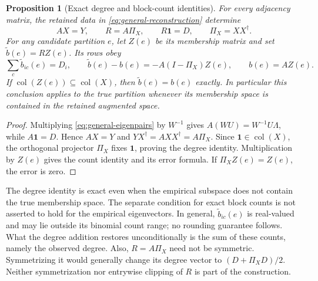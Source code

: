 \documentclass[11pt]{article}
\newtheorem{proposition}[theorem]{Proposition}
\theoremstyle{definition}
\theoremstyle{remark}
\newcommand{\one}{\mathbf 1}
\numberwithin{equation}{section}
\begin{document}
\begin{proposition}[Exact degree and block-count identities]
\label{prop:degree-count-identities}
For every adjacency matrix, the retained data in
\eqref{eq:general-reconstruction} determine
\begin{equation}
 AX=Y,\qquad R=A\Pi_X,\qquad R\one=D,
 \qquad \Pi_X=XX^\dagger.
 \label{eq:degree-identities}
\end{equation}
For any candidate partition $e$, let $Z(e)$ be its membership matrix and set
$\widetilde b(e)=RZ(e)$. Its rows obey
\begin{equation}
 \sum_c\widetilde b_{ic}(e)=D_i,\qquad
 \widetilde b(e)-b(e)=-A(I-\Pi_X)Z(e),\qquad b(e)=AZ(e).
 \label{eq:general-block-counts}
\end{equation}
If $\operatorname{col}(Z(e))\subseteq\operatorname{col}(X)$, then
$\widetilde b(e)=b(e)$ exactly. In particular this conclusion applies to
the true partition whenever its membership space is contained in the
retained augmented space.
\end{proposition}
\begin{proof}
Multiplying \eqref{eq:general-eigenpairs} by $W^{-1}$ gives
$A(WU)=W^{-1}U\Lambda$, while $A\one=D$. Hence $AX=Y$ and
$YX^\dagger=AXX^\dagger=A\Pi_X$. Since $\one\in\operatorname{col}(X)$,
the orthogonal projector $\Pi_X$ fixes $\one$, proving the degree identity.
Multiplication by $Z(e)$ gives the count identity and its error formula.
If $\Pi_XZ(e)=Z(e)$, the error is zero.
\end{proof}

The degree identity is exact even when the empirical subspace does not
contain the true membership space. The separate condition for exact block
counts is not asserted to hold for the empirical eigenvectors. In general,
$\widetilde b_{ic}(e)$ is real-valued and may lie outside its binomial count
range; no rounding guarantee follows. What the degree addition restores
unconditionally is the sum of these counts, namely the observed degree.
Also, $R=A\Pi_X$ need not be symmetric. Symmetrizing it would generally
change its degree vector to $(D+\Pi_XD)/2$. Neither symmetrization nor
entrywise clipping of $R$ is part of the construction.
\end{document}
